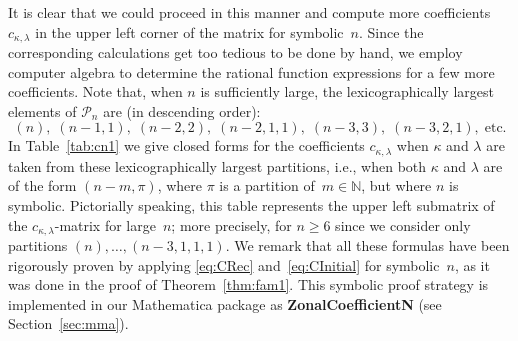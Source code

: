 \documentclass{mathincs}
\numberwithin{equation}{section}
\numberwithin{figure}{section}
\theoremstyle{plain}
\theoremstyle{definition}
\theoremstyle{remark}
\theoremstyle{plain}
\theoremstyle{definition}
\theoremstyle{plain}
\theoremstyle{plain}
\begin{document}
It is clear that we could proceed in this manner and compute more coefficients
$c_{\kappa,\lambda}$ in the upper left corner of the matrix for symbolic~$n$.
Since the corresponding calculations get too tedious to be done by hand, we
employ computer algebra to determine the rational function expressions for a
few more coefficients.  Note that, when $n$ is sufficiently large, the
lexicographically largest elements of $\mathcal{P}_n$ are (in descending
order): %
\[
  (n), \; (n-1,1), \; (n-2,2), \; (n-2,1,1), \; (n-3,3), \; (n-3,2,1), \; \text{etc.}
\]
In Table~\ref{tab:cn1} we give closed forms for the coefficients
$c_{\kappa,\lambda}$ when $\kappa$ and $\lambda$ are taken from these
lexicographically largest partitions, i.e., when both $\kappa$ and $\lambda$
are of the form $(n-m,\pi)$, where $\pi$ is a partition of~$m\in\mathbb{N}$,
but where $n$ is symbolic.  Pictorially speaking, this table represents the
upper left submatrix of the $c_{\kappa,\lambda}$-matrix for large~$n$; more
precisely, for $n\geq6$ since we consider only partitions
$(n),\dots,(n-3,1,1,1)$. We remark that all these formulas have been
rigorously proven by applying \eqref{eq:CRec} and~\eqref{eq:CInitial} for
symbolic~$n$, as it was done in the proof of Theorem~\ref{thm:fam1}. This
symbolic proof strategy is implemented in our Mathematica package as
\textbf{ZonalCoefficientN} (see Section~\ref{sec:mma}).
\end{document}
